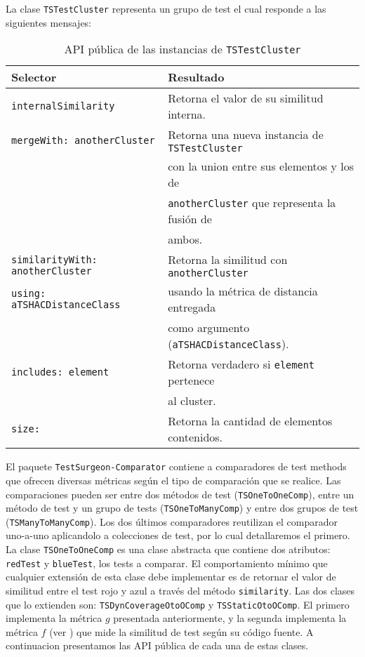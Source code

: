 \clearpage
\par La clase {\tt TSTestCluster} representa un grupo de test el cual responde a las siguientes mensajes: 

\begin{table}[h] 
    \centering 
    \begin{tabular}{|l|l|}
    	\hline
\textbf{Selector} & \textbf{Resultado} \\ \hline \hline

{\tt internalSimilarity } & Retorna el valor de su similitud interna.\\ \hline
{\tt mergeWith: anotherCluster} & Retorna una nueva instancia de {\tt TSTestCluster} \\ 
						& con la union entre sus elementos y los de  \\ 
						& {\tt anotherCluster} que representa la fusión de \\
						& ambos. \\ \hline
{\tt similarityWith: anotherCluster}	& Retorna la similitud con {\tt anotherCluster} \\ 
{\tt using: aTSHACDistanceClass } &  usando la métrica de distancia entregada  \\
						& como argumento ({\tt aTSHACDistanceClass}).\\ \hline
{\tt includes: element} & Retorna verdadero si {\tt element} pertenece \\
						&  al cluster.\\ \hline
{\tt size:} & Retorna la cantidad de elementos contenidos. \\ \hline		
				
    \end{tabular}
    \caption{API pública de las instancias de {\tt TSTestCluster}}
\end{table}  

\vspace*{2cm}

\par El paquete {\tt TestSurgeon-Comparator} contiene a comparadores de test methods que ofrecen diversas métricas según el tipo de comparación que se realice. Las comparaciones pueden ser entre dos métodos de test ({\tt TSOneToOneComp}), entre un método de test y un grupo de tests ({\tt TSOneToManyComp}) y entre dos grupos de test ({\tt TSManyToManyComp}). Los dos últimos comparadores reutilizan el comparador uno-a-uno aplicandolo a colecciones de test, por lo cual detallaremos el primero. La clase {\tt TSOneToOneComp} es una clase abstracta que contiene dos atributos: {\tt redTest} y {\tt blueTest}, los tests a comparar. El comportamiento mínimo que cualquier extensión de esta clase debe implementar es de retornar el valor de similitud entre el test rojo y azul a través del método {\tt similarity}. Las dos clases que lo extienden son: {\tt TSDynCoverageOtoOComp} y {\tt TSStaticOtoOComp}. El primero implementa la métrica $g$ presentada anteriormente, y la segunda implementa la métrica $f$ (ver ) que mide la similitud de test según su código fuente. A continuacion presentamos las API pública de cada una de estas clases.



